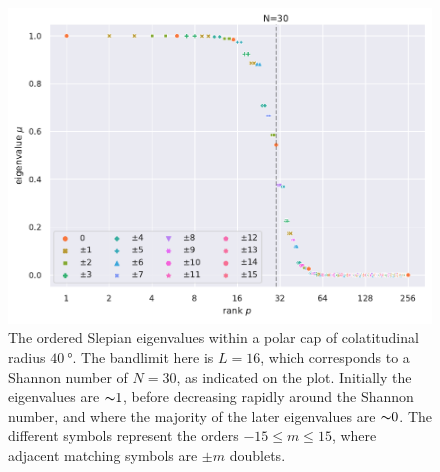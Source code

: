 \begin{figure}[htpb]
	\centering\capstart{}
	\includegraphics[width=\textwidth]{polar_cap_eigenvalues.pdf}
	\caption[
		The Slepian eigenvalues within a \(\SI{40}{\degree}\) polar cap
	]{
		The ordered Slepian eigenvalues within a polar cap of colatitudinal radius \(\SI{40}{\degree}\).
		The bandlimit here is  \(L=16\), which corresponds to a Shannon number of \(N=30\), as indicated on the plot.
		Initially the eigenvalues are \({\thicksim}1\), before decreasing rapidly around the Shannon number, and where the majority of the later eigenvalues are \({\thicksim}0\).
		The different symbols represent the orders \(-15 \leq m \leq 15\), where adjacent matching symbols are \(\pm m\) doublets.
	}\label{fig:chapter2_polar_cap_eigenvalues}
\end{figure}
